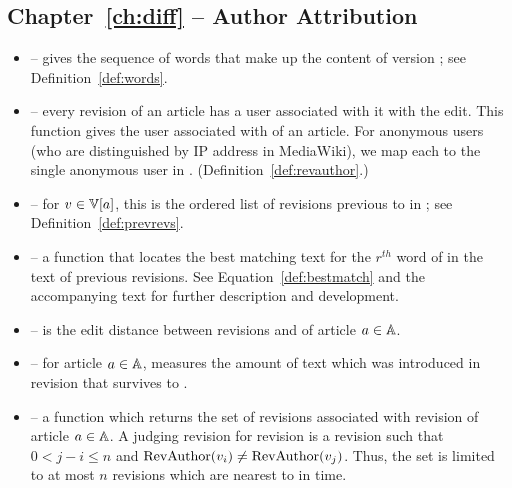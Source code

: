 \subsection{Chapter~\ref{ch:diff} -- Author Attribution}

\begin{itemize}

\item \words{\version{}} -- gives the sequence of words that make
    up the content of version \version{}; see
    Definition~\ref{def:words}.

\item \revauthor{\version{}} -- every revision of an article has
    a user associated with it with the edit.
    This function gives the user associated with \version{} of
    an article.
    For anonymous users (who are distinguished by IP address in
    MediaWiki), we map each to the single anonymous user in \users.
    (Definition~\ref{def:revauthor}.)

\item \prevrevs{\version{}} -- for $\version{} \in \versions{a}$,
    this is the ordered list of revisions previous to \version{}
    in ; see Definition~\ref{def:prevrevs}.

\item {} -- a function
    that locates the best matching text for the $r^{th}$ word of
     in the text of previous revisions.
    See Equation~\ref{def:bestmatch} and the accompanying text
    for further description and development.

\item {} -- is the edit distance between revisions
     and  of article $a \in \mathbb{A}$.

\item {} -- for article $a \in \mathbb{A}$, measures the
    amount of text which was introduced in revision 
    that survives to .

\item {} -- a function which returns the set of
     revisions associated with revision 
    of article $a \in \mathbb{A}$.
    A judging revision for revision  is a revision 
    such that $0 < j - i \le n$ and
    $\mathrm{RevAuthor}(v_{i}) \not= \mathrm{RevAuthor}(v_{j})$.
    Thus, the set is limited to at most $n$ revisions which are nearest
    to  in time.

\end{itemize}


\renewcommand{\labelitemi}{$\bullet$}



